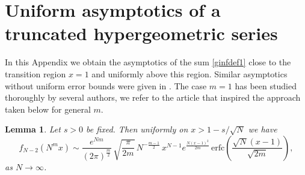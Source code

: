 \documentclass[11pt,reqno]{amsproc}
\newtheorem{lemma}[theorem]{Lemma}
\numberwithin{equation}{section}
\numberwithin{theorem}{section}
\begin{document}
\section{Uniform asymptotics of a truncated hypergeometric series}
In this Appendix we obtain the asymptotics of the sum \eqref{ginfdef1} close to the transition region $x=1$ and uniformly above this region. Similar asymptotics without uniform error bounds were given in \cite[Appendix C]{AB12}. The case $m=1$ has been studied thoroughly by several authors, we refer to the article \cite{BG07} that inspired the approach taken below for general $m$.
\begin{lemma}
\label{lem:fnedgelem}
Let $s>0$ be fixed. Then uniformly on $x>1-s/\sqrt{N}$ we have
\begin{equation}
f_{N-2}(N^{m}x) \sim \frac{e^{Nm}}{(2\pi)^{\frac{m}{2}}}\,\sqrt{\frac{\pi}{2m}}\,N^{-\frac{m-1}{2}}\,x^{N-1}e^{\frac{N(x-1)^{2}}{2m}}\,\mathrm{erfc}\left(\frac{\sqrt{N}(x-1)}{\sqrt{2m}}\right), \label{fnedge}
\end{equation}
as $N \to \infty$.
\end{lemma}
\end{document}
